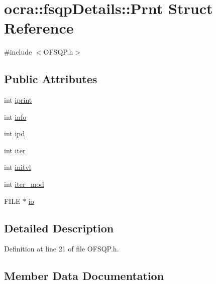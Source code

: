\hypertarget{structocra_1_1fsqpDetails_1_1Prnt}{}\section{ocra\+:\+:fsqp\+Details\+:\+:Prnt Struct Reference}
\label{structocra_1_1fsqpDetails_1_1Prnt}


{\ttfamily \#include $<$O\+F\+S\+Q\+P.\+h$>$}

\subsection*{Public Attributes}
\begin{DoxyCompactItemize}
\item 
int \hyperlink{structocra_1_1fsqpDetails_1_1Prnt_a6ae9ecd70d6b52123a4d24a8cc47dfa6}{iprint}
\item 
int \hyperlink{structocra_1_1fsqpDetails_1_1Prnt_a536e9b866d88796ae9520f1afbab3bdb}{info}
\item 
int \hyperlink{structocra_1_1fsqpDetails_1_1Prnt_a00e8213f2ec3c624907394b01ef7c171}{ipd}
\item 
int \hyperlink{structocra_1_1fsqpDetails_1_1Prnt_a276fb8038114797a04a94e1b2ec10a35}{iter}
\item 
int \hyperlink{structocra_1_1fsqpDetails_1_1Prnt_a040dc7b88b4f54f32fd662b40af9e1f4}{initvl}
\item 
int \hyperlink{structocra_1_1fsqpDetails_1_1Prnt_ab7a06548e1ccc8483b3221798ab15e7e}{iter\+\_\+mod}
\item 
F\+I\+LE $\ast$ \hyperlink{structocra_1_1fsqpDetails_1_1Prnt_a558896e07301f884eac55e411c6bfbd1}{io}
\end{DoxyCompactItemize}


\subsection{Detailed Description}


Definition at line 21 of file O\+F\+S\+Q\+P.\+h.



\subsection{Member Data Documentation}
